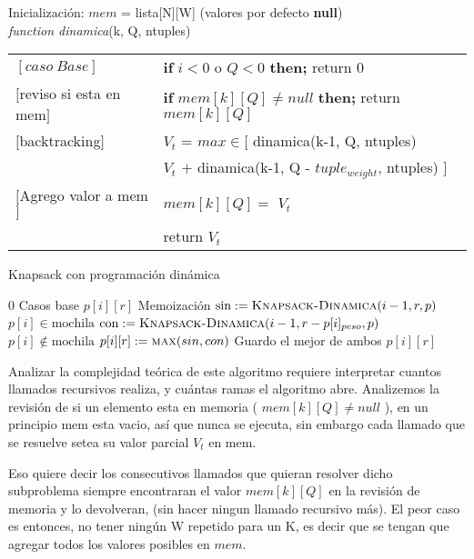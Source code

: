 \documentclass[fleqn, 11pt]{article}
\begin{document}
Inicialización: \quad \textit{$mem$} \quad = lista[N][W] (valores por defecto \textbf{null}) \\

\textit{function \quad dinamica}(k, Q, ntuples)


\begin{tabular}{l l}
    $[caso\ Base]$ & \textbf{if}  $i  <  0$ o  $Q  <  0$ \textbf{then;} return 0   \\
    $[$reviso si esta en mem$]$ & \textbf{if}  $mem[k][Q] \neq null$  \textbf{then;} return $mem[k][Q]$ \\
    $[$backtracking$]$ & \textit{$V_t$} = $ max \in  [ $  dinamica(k-1, Q, ntuples)  \\
    & \hspace{30pt} \textit{$V_t$} $ + $ dinamica(k-1, Q - $tuple_{weight}$, ntuples) $ ] $ \\
    $[$Agrego valor a mem$]$ &   $mem[k][Q] = $ \textit{$V_t$} \\
    & return \textit{$V_t$}

\end{tabular}

\begin{algorithm}
\caption{Knapsack con programación dinámica}
\begin{algorithmic}[1]
\State \Return $0$
\Comment Casos base
\EndIf
{}
\State	\Return $p[i][r]$
\Comment Memoización
\EndIf
\State $\text{sin} := \Call{Knapsack-Dinamica}{i - 1, r, p}$
\Comment $p[i] \in \text{mochila}$
\State $\text{con} := \Call{Knapsack-Dinamica}{i - 1, r - p[i]_{peso}, p}$
\Comment $p[i] \not\in \text{mochila}$
\State $p[i][r] := \Call{max}{sin, con}$
\Comment Guardo el mejor de ambos
\State \Return $p[i][r]$
\EndFunction
\end{algorithmic}
\end{algorithm}

Analizar la complejidad teórica de este algoritmo requiere interpretar cuantos llamados recursivos realiza, y cuántas ramas el algoritmo abre. Analizemos la revisión de si un elemento esta en memoria ( $mem[k][Q] \neq null$ ), en un principio mem esta vacio,  así que nunca se ejecuta, sin embargo cada llamado que se resuelve setea su valor parcial \textit{$V_t$} en mem.

Eso quiere decir los consecutivos llamados que quieran resolver dicho subproblema siempre encontraran el valor $mem[k][Q]$ en la revisión de memoria y lo devolveran, (sin hacer ningun llamado recursivo más). El peor caso es entonces, no tener ningún W repetido para un K, es decir que se tengan que agregar todos los valores posibles en $mem$.
\end{document}

